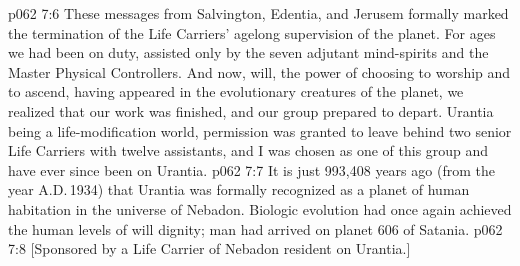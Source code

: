 \vs p062 7:6 These messages from Salvington, Edentia, and Jerusem formally marked the termination of the Life Carriers’ agelong supervision of the planet. For ages we had been on duty, assisted only by the seven adjutant mind\hyp{}spirits and the Master Physical Controllers. And now, will, the power of choosing to worship and to ascend, having appeared in the evolutionary creatures of the planet, we realized that our work was finished, and our group prepared to depart. Urantia being a life\hyp{}modification world, permission was granted to leave behind two senior Life Carriers with twelve assistants, and I was chosen as one of this group and have ever since been on Urantia.
\vs p062 7:7 It is just 993,408 years ago (from the year A.D.\,1934) that Urantia was formally recognized as a planet of human habitation in the universe of Nebadon. Biologic evolution had once again achieved the human levels of will dignity; man had arrived on planet 606 of Satania.
\vsetoff
\vs p062 7:8 [Sponsored by a Life Carrier of Nebadon resident on Urantia.]
